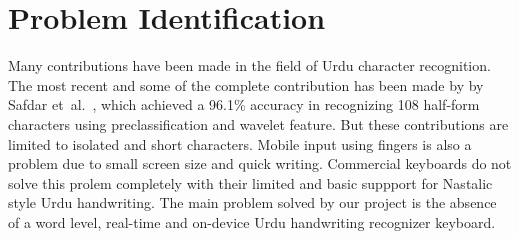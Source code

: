 \documentclass[12pt,a4paper]{report}
\begin{document}
\section{Problem Identification}
Many contributions have been made in the field of Urdu character recognition. The most recent and some of the complete contribution has been made by by Safdar et~al.\ \cite{safdar2022}, which achieved a 96.1\% accuracy in recognizing 108 half-form characters using preclassification and wavelet feature. But these contributions are limited to isolated and short characters. Mobile input using fingers is also a problem due to small screen size and quick writing. Commercial keyboards do not solve this prolem completely with their limited and basic suppport for Nastalic style Urdu handwriting. The main problem solved by our project is the absence of a word level, real-time and on-device Urdu handwriting recognizer keyboard.
\end{document}

